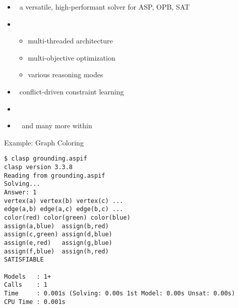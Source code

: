 \begin{frame}{\clasp}
  \begin{itemize}
  \item {} \ a versatile, high-performant solver for ASP, OPB, SAT
  \item {}
    \begin{itemize}
    \item multi-threaded architecture
    \item multi-objective optimization
    \item various reasoning modes
    \end{itemize}
  \item {}   \  conflict-driven constraint learning
  \item {}   \ \cite{gekasc09c,gekasc12b,gekakasc12a}
  \item {} \ \cite{nefrle18a} and many more within \clingo
  \end{itemize}
\end{frame}

\begin{frame}[fragile]{Example: Graph Coloring}
\begin{adjustbox}{max totalsize={\textwidth}{.83\textheight},keepaspectratio}
\begin{lstlisting}
$ clasp grounding.aspif
clasp version 3.3.8
Reading from grounding.aspif
Solving...
Answer: 1
vertex(a) vertex(b) vertex(c) ...
edge(a,b) edge(a,c) edge(b,c) ...
color(red) color(green) color(blue)
assign(a,blue)  assign(b,red)
assign(c,green) assign(d,blue)
assign(e,red)   assign(g,blue)
assign(f,blue)  assign(h,red)
SATISFIABLE

Models   : 1+
Calls    : 1
Time     : 0.001s (Solving: 0.00s 1st Model: 0.00s Unsat: 0.00s)
CPU Time : 0.001s
\end{lstlisting}%
\end{adjustbox}
\end{frame}

%
